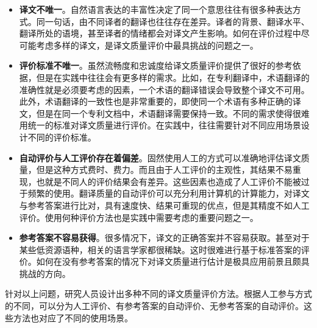 \begin{itemize}
\vspace{0.5em}
\item {\small\sffamily\bfseries{译文不唯一}}。自然语言表达的丰富性决定了同一个意思往往有很多种表达方式。同一句话，由不同译者的翻译也往往存在差异。译者的背景、翻译水平、翻译所处的语境，甚至译者的情绪都会对译文产生影响。如何在评价过程中尽可能考虑多样的译文，是译文质量评价中最具挑战的问题之一。
\vspace{0.5em}
\item {\small\sffamily\bfseries{评价标准不唯一}}。虽然流畅度和忠诚度给译文质量评价提供了很好的参考依据，但是在实践中往往会有更多样的需求。比如，在专利翻译中，术语翻译的准确性就是必须要考虑的因素，一个术语的翻译错误会导致整个译文不可用。此外，术语翻译的一致性也是非常重要的，即使同一个术语有多种正确的译文，但是在同一个专利文档中，术语翻译需要保持一致。不同的需求使得很难用统一的标准对译文质量进行评价。在实践中，往往需要针对不同应用场景设计不同的评价标准。
\vspace{0.5em}
\item {\small\sffamily\bfseries{自动评价与人工评价存在着偏差}}。固然使用人工的方式可以准确地评估译文质量，但是这种方式费时、费力。而且由于人工评价的主观性，其结果不易重现，也就是不同人的评价结果会有差异。这些因素也造成了人工评价不能被过于频繁的使用。翻译质量的自动评价可以充分利用计算机的计算能力，对译文与参考答案进行比对，具有速度快、结果可重现的优点，但是其精度不如人工评价。使用何种评价方法也是实践中需要考虑的重要问题之一。
\vspace{0.5em}
\item {\small\sffamily\bfseries{参考答案不容易获得}}。很多情况下，译文的正确答案并不容易获取。甚至对于某些低资源语种，相关的语言学家都很稀缺。这时很难进行基于标准答案的评价。如何在没有参考答案的情况下对译文质量进行估计是极具应用前景且颇具挑战的方向。
\vspace{0.5em}
\end{itemize}

\parinterval 针对以上问题，研究人员设计出多种不同的译文质量评价方法。根据人工参与方式的不同，可以分为人工评价、有参考答案的自动评价、无参考答案的自动评价。这些方法也对应了不同的使用场景。

